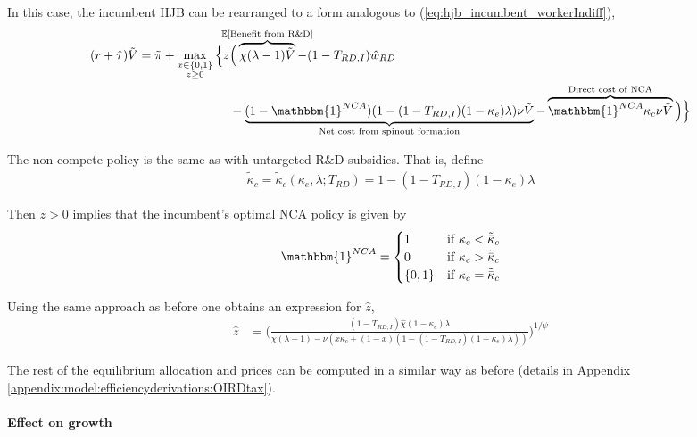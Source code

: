 \documentclass[11pt,english]{article}
\begin{document}
In this case, the incumbent HJB can be rearranged to a form analogous to (\ref{eq:hjb_incumbent_workerIndiff}),
\begin{align}
(r + \hat{\tau}) \tilde{V} = \tilde{\pi} + \max_{\substack{x \in \{0,1\} \\ z \ge 0}} \Big\{z &\Big( \overbrace{\chi (\lambda - 1) \tilde{V}}^{\mathclap{\mathbb{E}[\textrm{Benefit from R\&D}]}}- (1-T_{RD,I}) \hat{w}_{RD} \\
&-  \underbrace{(1-\mathbbm{1}^{NCA})(1 - (1-T_{RD,I})(1-\kappa_{e})\lambda)\nu \tilde{V}}_{\mathclap{\text{Net cost from spinout formation}}} - \overbrace{\mathbbm{1}^{NCA} \kappa_{c} \nu \tilde{V}}^{\mathclap{\text{Direct cost of NCA}}}\Big) \Big\} \label{eq:hjb_incumbent_RDsubsidyTargeted_2}
\end{align}

The non-compete policy is the same as with untargeted R\&D subsidies. That is, define
\begin{align}
\tilde{\bar{\kappa}}_c = \tilde{\bar{\kappa}}_c(\kappa_e,\lambda;T_{RD}) = 1 - (1-T_{RD,I})(1-\kappa_e)\lambda
\end{align} 

Then $z > 0$ implies that the incumbent's optimal NCA policy is given by 
\begin{align}
\mathbbm{1}^{NCA} = \begin{cases}
1 & \textrm{if } \kappa_{c} < \tilde{\bar{\kappa}}_c  \\
0 & \textrm{if } \kappa_{c} > \tilde{\bar{\kappa}}_c \\
\{0,1\} & \textrm{if } \kappa_c = \tilde{\bar{\kappa}}_c 
\end{cases} \label{eq:nca_policy_RDsubsidyTargeted}
\end{align}

Using the same approach as before one obtains an expression for $\hat{z}$, 
\begin{align}
\hat{z} &= \Bigg( \frac{(1-T_{RD,I})\hat{\chi} (1-\kappa_{e}) \lambda}{\chi(\lambda -1) - \nu (x\kappa_c + (1-x)(1 - (1-T_{RD,I})(1-\kappa_e)\lambda)) } \Bigg)^{1/\psi} \label{eq:effort_entrant_RDsubsidyTargeted}
\end{align}

The rest of the equilibrium allocation and prices can be computed in a similar way as before (details in Appendix \ref{appendix:model:efficiencyderivations:OIRDtax}). 






\paragraph{Effect on growth}
\end{document}
